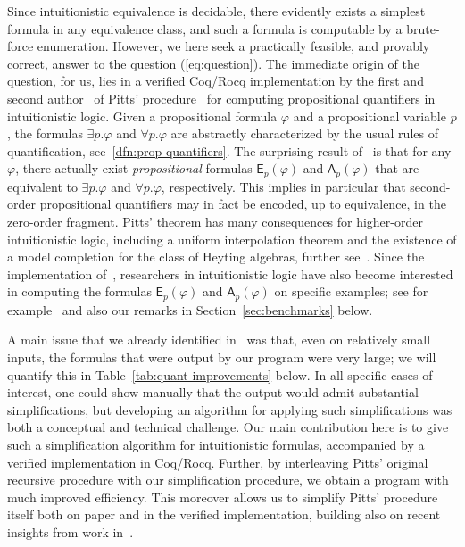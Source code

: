 \documentclass[english,review]{jflart}
\newcommand{\Coq}{{Coq/Rocq}}
\theoremstyle{definition}
\theoremstyle{plain}
\newcommand{\Ap}[1]{\mathsf{A}_{p}(#1)}
\newcommand{\Ep}[1]{\mathsf{E}_{p}(#1)}
\renewcommand{\phi}{\varphi}
\begin{document}
Since intuitionistic equivalence is decidable, there evidently exists a simplest formula in any equivalence class, and such a formula is computable by a brute-force enumeration. However, we here seek a practically feasible, and provably correct, answer to the question (\ref{eq:question}).
The immediate origin of the question, for us, lies in a verified {\Coq} implementation by the first and second author~\cite{FerGoo2023} of Pitts' procedure~\cite{Pit1992} for computing propositional quantifiers in intuitionistic logic. Given a propositional formula $\phi$ and a propositional variable $p$, the formulas $\exists p. \phi$ and $\forall p. \phi$ are abstractly characterized by the usual rules of quantification, see~\cref{dfn:prop-quantifiers}. The surprising result of~\cite{Pit1992} is that for any $\phi$, there actually exist \emph{propositional} formulas $\Ep{\phi}$ and $\Ap{\phi}$ that are equivalent to $\exists p. \phi$ and $\forall p. \phi$, respectively. This implies in particular that second-order propositional quantifiers may in fact be encoded, up to equivalence, in the zero-order fragment. Pitts' theorem has many consequences for higher-order intuitionistic logic, including a uniform interpolation theorem and the existence of a model completion for the class of Heyting algebras, further see~\cite{GhiZaw2002}. Since the implementation of~\cite{FerGoo2023}, researchers in intuitionistic logic have also become interested in computing the formulas $\Ep{\phi}$ and $\Ap{\phi}$ on specific examples; see for example~\cite{Koc2023} and also our remarks in Section~\ref{sec:benchmarks} below.

A main issue that we already identified in~\cite{FerGoo2023} was that, even on relatively small inputs, the formulas that were output by our program were very large; we will quantify this in Table~\ref{tab:quant-improvements} below. In all specific cases of interest, one could show manually that the output would admit substantial simplifications, but developing an algorithm for applying such simplifications was both a conceptual and technical challenge. Our main contribution here is to give such a simplification algorithm for intuitionistic formulas, accompanied by a verified implementation in {\Coq}. Further, by interleaving Pitts' original recursive procedure with our simplification procedure, we obtain a program with much improved efficiency. This moreover allows us to simplify Pitts' procedure itself both on paper and in the verified implementation, building also on recent insights from work in~\cite{FGGS2024}. 
\end{document}
